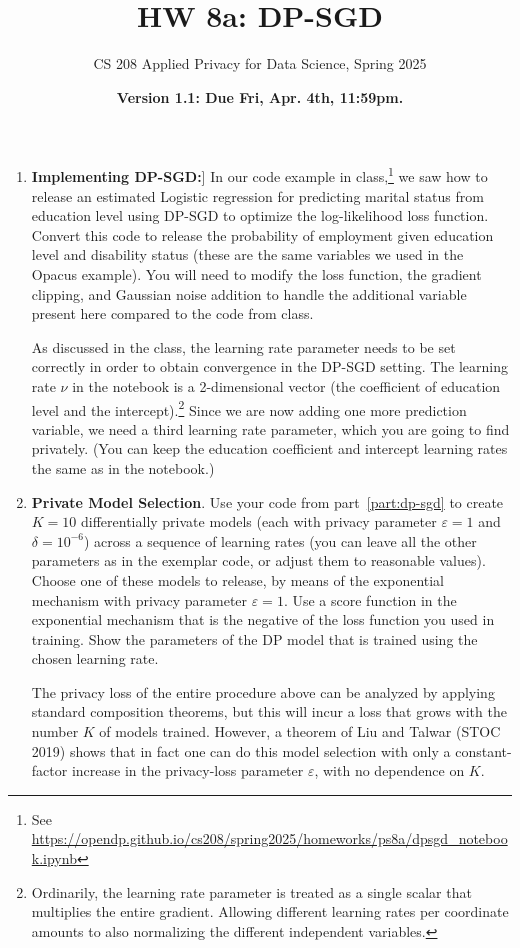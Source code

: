 \documentclass[11pt]{article}
\title{\vspace{-1.5cm} HW 8a: DP-SGD}
\author{CS 208 Applied Privacy for Data Science, Spring 2025}
\date{\textbf{Version 1.1: Due Fri, Apr. 4th, 11:59pm.}}
\begin{document}
\maketitle

\instructions

\begin{enumerate}[leftmargin=*] 

    \item \textbf{Implementing DP-SGD:}]\label{part:dp-sgd}
    In our code example in class,\footnote{See \url{https://opendp.github.io/cs208/spring2025/homeworks/ps8a/dpsgd_notebook.ipynb}} 
    we saw how to release an estimated Logistic regression for predicting marital status from education level using DP-SGD to optimize the log-likelihood loss function.  Convert this code to release the probability of employment given education level and disability status (these are the same variables we used in the Opacus example). You will need to modify the loss function, the gradient clipping, and Gaussian noise addition to handle the additional variable present here compared to the code from class.     
        
    As discussed in the class, the learning rate parameter needs to be set correctly in order to obtain convergence in the DP-SGD setting. 
    The learning rate $\nu$ in the notebook is a 2-dimensional vector (the coefficient of education level and the intercept).\footnote{Ordinarily,
    the learning rate parameter is treated as a single scalar that multiplies the entire gradient.  Allowing different learning rates per coordinate amounts to also normalizing the different independent variables.}
    Since we are
    now adding one more prediction variable, we need a third learning rate parameter, which you are going to find privately.  (You can keep the education coefficient and intercept learning rates the same as in the notebook.)

    \item \textbf{Private Model Selection}. Use your code from part~\ref{part:dp-sgd} to create $K=10$ differentially private models (each with privacy parameter $\varepsilon=1$ and $\delta=10^{-6}$) across a sequence of learning rates (you can leave all the other parameters as in the exemplar code, or adjust them to reasonable values). Choose one of these models to release, by means of the exponential mechanism with privacy parameter $\varepsilon=1$. Use a score function in the exponential mechanism that is the negative of the loss function you used in training. Show the parameters of the DP model that is trained using the chosen learning rate. 
    
    The privacy loss of the entire procedure above can be analyzed by applying standard composition theorems, but this will incur a loss that grows with the number $K$ of models trained. However, a theorem of Liu and Talwar (STOC 2019) shows that in fact one can do this model selection with only a constant-factor increase in the privacy-loss parameter $\varepsilon$, with no dependence on  $K$.

\end{enumerate}
\end{document}
